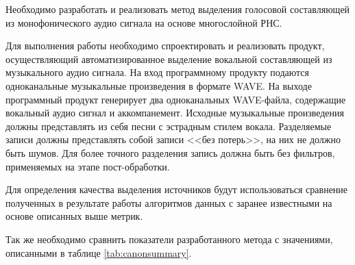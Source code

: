 Необходимо разработать и реализовать метод выделения голосовой составляющей из монофонического аудио сигнала на основе многослойной РНС.

Для выполнения работы необходимо спроектировать и реализовать продукт, осуществляющий автоматизированное выделение вокальной составляющей из музыкального аудио сигнала. На вход программному продукту подаются одноканальные музыкальные произведения в формате WAVE. На выходе программный продукт генерирует два одноканальных WAVE-файла, содержащие вокальный аудио сигнал и аккомпанемент. Исходные музыкальные произведения должны представлять из себя песни с эстрадным стилем вокала. Разделяемые записи должны представлять собой записи <<без потерь>>, на них не должно быть шумов. Для более точного разделения запись должна быть без фильтров, применяемых на этапе пост-обработки.

Для определения качества выделения источников будут использоваться сравнение полученных в результате работы алгоритмов данных с заранее известными на основе описанных выше метрик.

Так же необходимо сравнить показатели разработанного метода с значениями, описанными в таблице \ref{tab:canonsummary}.

